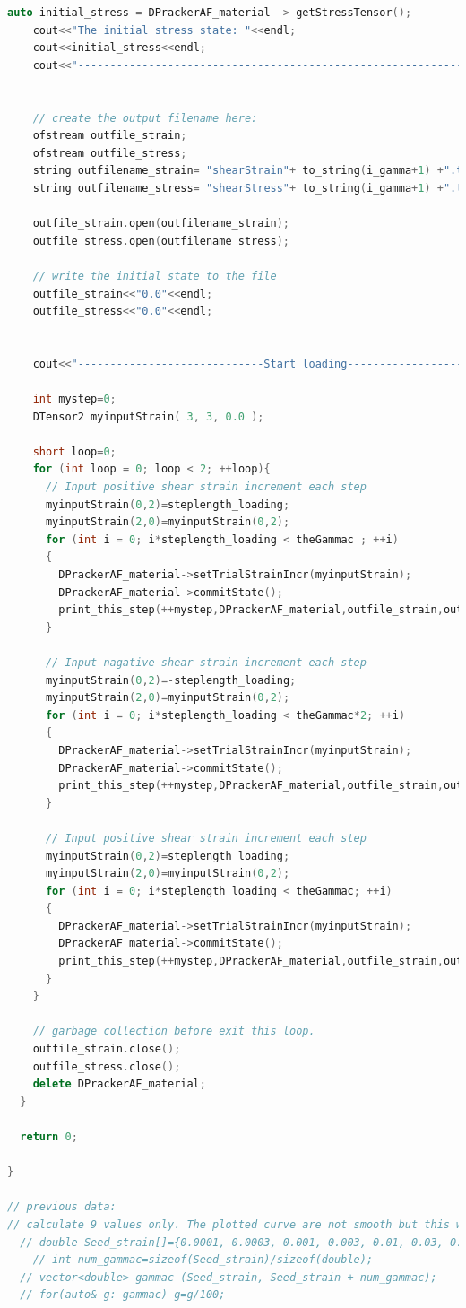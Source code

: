 \documentclass[fleqn,11pt]{article}
\begin{document}
\begin{lstlisting}[language=C++, frame=single]
    auto initial_stress = DPrackerAF_material -> getStressTensor();
    cout<<"The initial stress state: "<<endl;
    cout<<initial_stress<<endl;
    cout<<"-----------------------------------------------------------------------"<<endl;
    

    // create the output filename here:
    ofstream outfile_strain;
    ofstream outfile_stress;
    string outfilename_strain= "shearStrain"+ to_string(i_gamma+1) +".txt" ;
    string outfilename_stress= "shearStress"+ to_string(i_gamma+1) +".txt" ;
    
    outfile_strain.open(outfilename_strain);
    outfile_stress.open(outfilename_stress);

    // write the initial state to the file 
    outfile_strain<<"0.0"<<endl;
    outfile_stress<<"0.0"<<endl;


    cout<<"-----------------------------Start loading-----------------------------"<<endl;

    int mystep=0;
    DTensor2 myinputStrain( 3, 3, 0.0 );
    
    short loop=0;
    for (int loop = 0; loop < 2; ++loop){
      // Input positive shear strain increment each step
      myinputStrain(0,2)=steplength_loading;
      myinputStrain(2,0)=myinputStrain(0,2);
      for (int i = 0; i*steplength_loading < theGammac ; ++i)
      {
        DPrackerAF_material->setTrialStrainIncr(myinputStrain);
        DPrackerAF_material->commitState();
        print_this_step(++mystep,DPrackerAF_material,outfile_strain,outfile_stress);
      }

      // Input nagative shear strain increment each step
      myinputStrain(0,2)=-steplength_loading;
      myinputStrain(2,0)=myinputStrain(0,2);
      for (int i = 0; i*steplength_loading < theGammac*2; ++i)
      {
        DPrackerAF_material->setTrialStrainIncr(myinputStrain);
        DPrackerAF_material->commitState();
        print_this_step(++mystep,DPrackerAF_material,outfile_strain,outfile_stress);
      }

      // Input positive shear strain increment each step
      myinputStrain(0,2)=steplength_loading;
      myinputStrain(2,0)=myinputStrain(0,2);
      for (int i = 0; i*steplength_loading < theGammac; ++i)
      {
        DPrackerAF_material->setTrialStrainIncr(myinputStrain);
        DPrackerAF_material->commitState();
        print_this_step(++mystep,DPrackerAF_material,outfile_strain,outfile_stress);
      }
    } 

    // garbage collection before exit this loop.
    outfile_strain.close();
    outfile_stress.close();
    delete DPrackerAF_material;
  }

  return 0;

}

// previous data:
// calculate 9 values only. The plotted curve are not smooth but this will be fast.
  // double Seed_strain[]={0.0001, 0.0003, 0.001, 0.003, 0.01, 0.03, 0.1, 0.3, 1};
    // int num_gammac=sizeof(Seed_strain)/sizeof(double);
  // vector<double> gammac (Seed_strain, Seed_strain + num_gammac);
  // for(auto& g: gammac) g=g/100;

\end{lstlisting}
\end{document}
